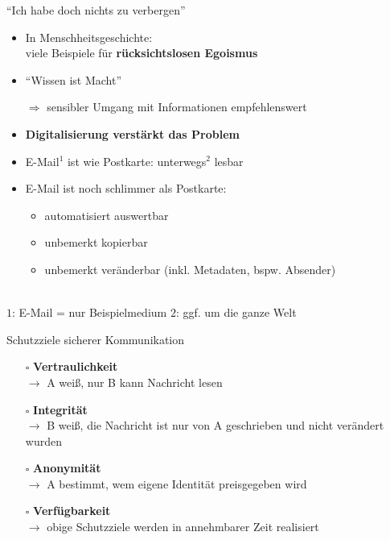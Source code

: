 \documentclass{beamer}
\begin{document}
\begin{frame}[label=ef1]{"`Ich habe doch nichts zu verbergen"'}
  
  \begin{itemize}
   \item  In Menschheitsgeschichte:\\
   viele Beispiele für \textbf{rücksichtslosen Egoismus}
   \item "`Wissen ist Macht"'
   \item[$\Rightarrow$] sensibler Umgang mit Informationen empfehlenswert\\[5mm]
   
   \pause

   \item \textbf{Digitalisierung verstärkt das Problem}
   \item E-Mail${}^{1}$ ist wie Postkarte: unterwegs${}^{2}$ lesbar
   \item E-Mail ist noch schlimmer als Postkarte:
   \begin{itemize}
    \item automatisiert auswertbar
    \item unbemerkt kopierbar
    \item unbemerkt veränderbar (inkl. Metadaten, bspw. Absender)
   \end{itemize}
  \end{itemize}
  
  ~\\[5mm]
  {\tiny $1$: E-Mail = nur Beispielmedium \qquad $2$: ggf. um die ganze Welt }

\end{frame}


\begin{frame}[label=ef2]{Schutzziele sicherer Kommunikation}

  \begin{itemize}
   \item[$\square$] \textbf{Vertraulichkeit}\\
   $\rightarrow$ A weiß, nur B kann Nachricht lesen

   \pause

   \item[$\square$] \textbf{Integrität}\\
   $\rightarrow$ B weiß, die Nachricht ist nur von A geschrieben und nicht verändert wurden

   \pause

   \item[$\square$] \textbf{Anonymität}\\
   $\rightarrow$ A bestimmt, wem eigene Identität preisgegeben wird

   \pause

   \item[$\square$] \textbf{Verfügbarkeit}\\
   $\rightarrow$ obige Schutzziele werden in annehmbarer Zeit realisiert
  \end{itemize}

\end{frame}
 
\end{document}
